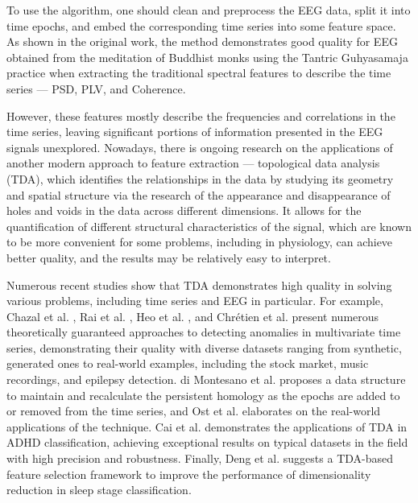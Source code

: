 \documentclass[shortAfour,times,sagev]{sagej}
\begin{document}
To use the algorithm, one should clean and preprocess the EEG data, split it into time epochs,
and embed the corresponding time series into some feature space. As shown in the original work,
the method demonstrates good quality for EEG obtained from the meditation of Buddhist monks
using the Tantric Guhyasamaja practice when extracting the traditional spectral
features to describe the time series --- PSD, PLV, and Coherence.

However, these features mostly describe the frequencies and correlations in the time series,
leaving significant portions of information presented in the EEG signals unexplored.
Nowadays, there is ongoing research on the applications of another modern approach to feature
extraction --- topological data analysis (TDA), which identifies the relationships in the data by studying
its geometry and spatial structure via the research of the appearance and disappearance
of holes and voids in the data across different dimensions. It allows for the quantification
of different structural characteristics of the signal, which are known to be more convenient for some problems,
including in physiology, can achieve better quality, and the results may be relatively easy to interpret.

Numerous recent studies show that TDA demonstrates high quality in solving various problems, including time series and EEG in particular. For example,  Chazal et al. \cite{chazal2024topologicalanalysisdetectinganomalies}, Rai et al. \cite{rai2024identifyingextremeeventsstock}, Heo et al. \cite{heo2024persistenthomologyfeaturedtime}, and Chr\'etien et al. \cite{chrétien2024timetopologicalanalysiseeg} present numerous theoretically guaranteed approaches to detecting anomalies in multivariate time series, demonstrating their quality with diverse datasets ranging from synthetic, generated ones to real-world examples, including the stock market, music recordings, and epilepsy detection. di Montesano  et al. \cite{dimontesano2024dynamicallymaintainingpersistenthomology} proposes a data structure to maintain and recalculate the persistent homology as the epochs are added to or removed from the time series, and Ost et al. \cite{ost2024bananatreespersistencetime} elaborates on the real-world applications of the technique.  Cai et al. \cite{cai2024topologicalfeaturesearchmethod} demonstrates the applications of TDA in ADHD classification, achieving exceptional results on typical datasets in the field with high precision and robustness. Finally, Deng et al. \cite{deng2024twostagehierarchicalexplainablefeature} suggests a TDA-based feature selection framework to improve the performance of dimensionality reduction in sleep stage classification.
\end{document}
